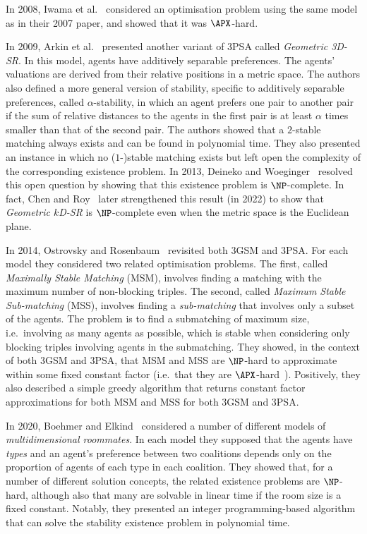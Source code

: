 In 2008, Iwama et al.~\cite{IMO08} considered an optimisation problem using the same model as in their 2007 paper, and showed that it was $\APX$-hard.

In 2009, Arkin et al.~\cite{ABEOMP09} presented another variant of 3PSA called \emph{Geometric 3D-SR}. In this model, agents have additively separable preferences. The agents' valuations are derived from their relative positions in a metric space. The authors also defined a more general version of stability, specific to additively separable preferences, called $\alpha$-stability, in which an agent prefers one pair to another pair if the sum of relative distances to the agents in the first pair is at least $\alpha$ times smaller than that of the second pair. The authors showed that a $2$-stable matching always exists and can be found in polynomial time. They also presented an instance in which no ($1$\nobreakdash-)stable matching exists but left open the complexity of the corresponding existence problem. In 2013, Deineko and Woeginger~\cite{DEINEKO20131837} resolved this open question by showing that this existence problem is $\NP$-complete. In fact, Chen and Roy~\cite{chen2022euclidean} later strengthened this result (in 2022) to show that \emph{Geometric $k$D-SR} is $\NP$-complete even when the metric space is the Euclidean plane.

In 2014, Ostrovsky and Rosenbaum~\cite{ostrovskyrosenbaum2014} revisited both 3GSM and 3PSA. For each model they considered two related optimisation problems. The first, called \textit{Maximally Stable Matching} (MSM), involves finding a matching with the maximum number of non-blocking triples. The second, called \textit{Maximum Stable Sub-matching} (MSS), involves finding a \emph{sub-matching} that involves only a subset of the agents. The problem is to find a submatching of maximum size, i.e.\ involving as many agents as possible, which is stable when considering only blocking triples involving agents in the submatching. They showed, in the context of both 3GSM and 3PSA, that MSM and MSS are $\NP$-hard to approximate within some fixed constant factor (i.e.\ that they are $\APX$-hard~\cite{ACGKMP99}). Positively, they also described a simple greedy algorithm that returns constant factor approximations for both MSM and MSS for both 3GSM and 3PSA.

In 2020, Boehmer and Elkind~\cite{Boe20} considered a number of different models of \emph{multidimensional roommates}. In each model they supposed that the agents have \emph{types} and an agent's preference between two coalitions depends only on the proportion of agents of each type in each coalition. They showed that, for a number of different solution concepts, the related existence problems are $\NP$-hard, although also that many are solvable in linear time if the room size is a fixed constant. Notably, they presented an integer programming-based algorithm that can solve the stability existence problem in polynomial time.

